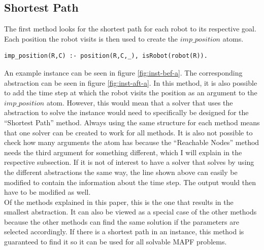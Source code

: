 \documentclass[runningheads]{llncs}
\begin{document}
\subsection{Shortest Path}
The first method looks for the shortest path for each robot to its respective goal. Each position the robot visits is then used to create the $imp\_position$ atoms. 
\begin{verbatim}
imp_position(R,C) :- position(R,C,_), isRobot(robot(R)).
\end{verbatim}
An example instance can be seen in figure \ref{fig:inst-bef-a}. The corresponding abstraction can be seen in figure \ref{fig:inst-aft-a}.
In this method, it is also possible to add the time step at which the robot visits the position as an argument to the $imp\_position$ atom. However, this would mean that a solver that uses the abstraction to solve the instance would need to specifically
be designed for the ``Shortest Path'' method. Always using the same structure for each method means that one solver can be created to work for all methods. It is also not possible to check how many arguments the atom has because the 
``Reachable Nodes'' method needs the third argument for something different, which I will explain in the respective subsection. If it is not of interest to have a solver that solves by using the different abstractions the same way, the line shown above can 
easily be modified to contain the information about the time step. The output would then have to be modified as well. \\
Of the methods explained in this paper, this is the one that results in the smallest abstraction. It can also be viewed as a special case of the other methods because the other methods can find the same solution if the parameters are selected accordingly. If there is a shortest path in an instance, this method is guaranteed to find it so it can be used for all solvable MAPF problems. 
\end{document}

